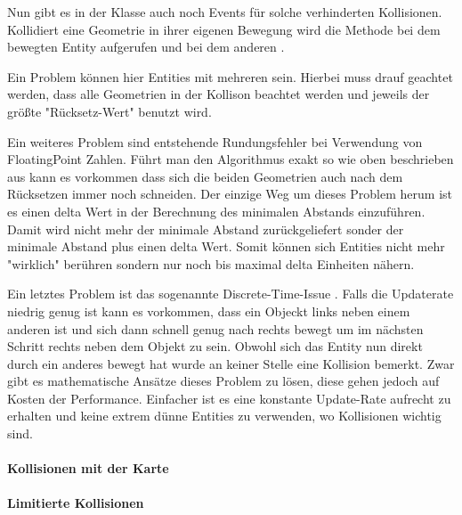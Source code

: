 Nun gibt es in der Klasse  auch noch Events für solche verhinderten Kollisionen. Kollidiert eine Geometrie in ihrer eigenen Bewegung wird die Methode  bei dem bewegten Entity aufgerufen und bei dem anderen .

Ein Problem können hier Entities mit mehreren  sein. Hierbei muss drauf geachtet werden, dass alle Geometrien in der Kollison beachtet werden und jeweils der größte "Rücksetz-Wert" benutzt wird.

Ein weiteres Problem sind entstehende Rundungsfehler bei Verwendung von FloatingPoint Zahlen. Führt man den Algorithmus exakt so wie oben beschrieben aus kann es vorkommen dass sich die beiden Geometrien auch nach dem Rücksetzen immer noch schneiden. Der einzige Weg um dieses Problem herum ist es einen delta Wert in der Berechnung des minimalen Abstands einzuführen. Damit wird nicht mehr der minimale Abstand zurückgeliefert sonder der minimale Abstand plus einen delta Wert. Somit können sich Entities nicht mehr "wirklich" berühren sondern nur noch bis maximal delta Einheiten nähern.

Ein letztes Problem ist das sogenannte Discrete-Time-Issue \cite[S 503]{DGIJ}. Falls die Updaterate niedrig genug ist kann es vorkommen, dass ein Objeckt links neben einem anderen ist und sich dann schnell genug nach rechts bewegt um im nächsten Schritt rechts neben dem Objekt zu sein. Obwohl sich das Entity nun direkt durch ein anderes bewegt hat wurde an keiner Stelle eine Kollision bemerkt. Zwar gibt es mathematische Ansätze dieses Problem zu lösen, diese gehen jedoch auf Kosten der Performance. Einfacher ist es eine konstante Update-Rate aufrecht zu erhalten und keine extrem dünne Entities zu verwenden, wo Kollisionen wichtig sind.


\paragraph{Kollisionen mit der Karte}

\paragraph{Limitierte Kollisionen}